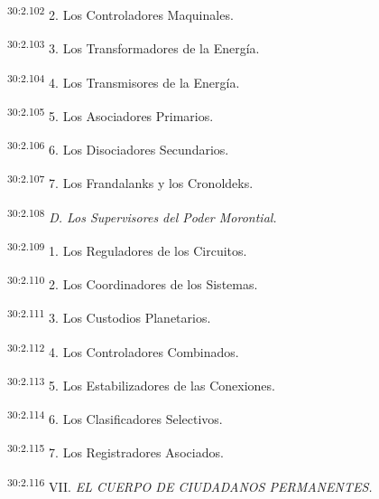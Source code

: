 \par
\textsuperscript{30:2.102} 2. Los Controladores Maquinales.

\par
\textsuperscript{30:2.103} 3. Los Transformadores de la Energía.

\par
\textsuperscript{30:2.104} 4. Los Transmisores de la Energía.

\par
\textsuperscript{30:2.105} 5. Los Asociadores Primarios.

\par
\textsuperscript{30:2.106} 6. Los Disociadores Secundarios.

\par
\textsuperscript{30:2.107} 7. Los Frandalanks y los Cronoldeks.

\par
\textsuperscript{30:2.108} \textit{D. Los Supervisores del Poder Morontial.}

\par
\textsuperscript{30:2.109} 1. Los Reguladores de los Circuitos.

\par
\textsuperscript{30:2.110} 2. Los Coordinadores de los Sistemas.

\par
\textsuperscript{30:2.111} 3. Los Custodios Planetarios.

\par
\textsuperscript{30:2.112} 4. Los Controladores Combinados.

\par
\textsuperscript{30:2.113} 5. Los Estabilizadores de las Conexiones.

\par
\textsuperscript{30:2.114} 6. Los Clasificadores Selectivos.

\par
\textsuperscript{30:2.115} 7. Los Registradores Asociados.

\par
\textsuperscript{30:2.116} VII. \textit{EL CUERPO DE CIUDADANOS PERMANENTES.}

